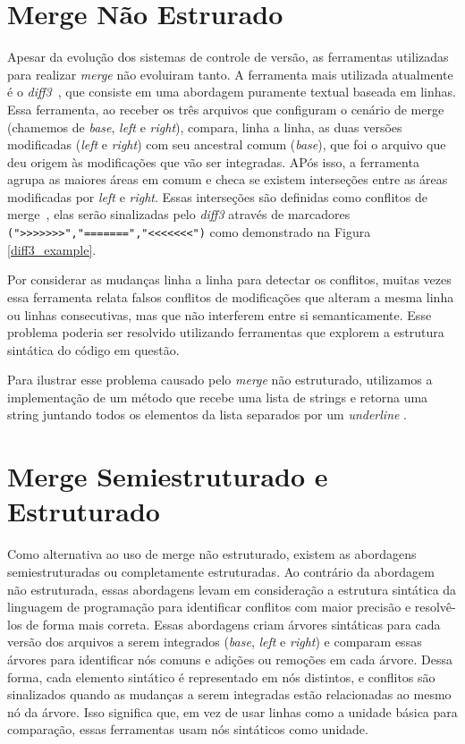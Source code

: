 \section{Merge Não Estrurado}
Apesar da evolução dos sistemas de controle de versão, as ferramentas utilizadas para realizar
\emph{merge} não evoluiram tanto. A ferramenta mais utilizada atualmente é o \emph{diff3}~\cite{mens02}, que consiste em uma
abordagem puramente textual baseada em linhas. Essa ferramenta, ao receber os três arquivos que configuram o cenário de merge
(chamemos de \emph{base}, \emph{left} e \emph{right}), compara, linha a linha, as duas versões modificadas
(\emph{left} e \emph{right}) com seu ancestral comum (\emph{base}), que foi o arquivo que deu origem às modificações
que vão ser integradas. APós isso, a ferramenta agrupa as maiores áreas em comum e checa se existem interseções entre as
áreas modificadas por \emph{left} e \emph{right}. Essas interseções são definidas como conflitos de merge~\cite{khan07},
elas serão sinalizadas pelo \emph{diff3} através de marcadores \verb|(">>>>>>>","=======","<<<<<<<")| como demonstrado na
Figura \ref{diff3_example}.

Por considerar as mudanças linha a linha para detectar os conflitos, muitas vezes essa ferramenta relata falsos conflitos
de modificações que alteram a mesma linha ou linhas consecutivas, mas que não interferem entre si semanticamente.
Esse problema poderia ser resolvido utilizando ferramentas que explorem a estrutura sintática do código em questão.

Para ilustrar esse problema causado pelo \emph{merge} não estruturado, utilizamos a implementação de um método 
 que
recebe uma lista de strings e retorna uma string juntando todos os elementos da lista separados por um
\emph{underline} .

\section{Merge Semiestruturado e Estruturado}
Como alternativa ao uso de merge não estruturado, existem as abordagens
semiestruturadas ou completamente estruturadas. Ao contrário da abordagem não
estruturada, essas abordagens levam em consideração a estrutura sintática da
linguagem de programação para identificar conflitos com maior precisão e resolvê-los de
forma mais correta. Essas abordagens criam árvores sintáticas para
cada versão dos arquivos a serem integrados (\emph{base}, \emph{left} e \emph{right})
e comparam essas árvores para identificar nós comuns
e adições ou remoções em cada árvore. Dessa forma, cada elemento sintático
é representado em nós distintos, e conflitos são sinalizados quando as mudanças
a serem integradas estão relacionadas ao mesmo nó da árvore. Isso significa
que, em vez de usar linhas como a unidade básica para comparação, essas ferramentas usam
nós sintáticos como unidade.

